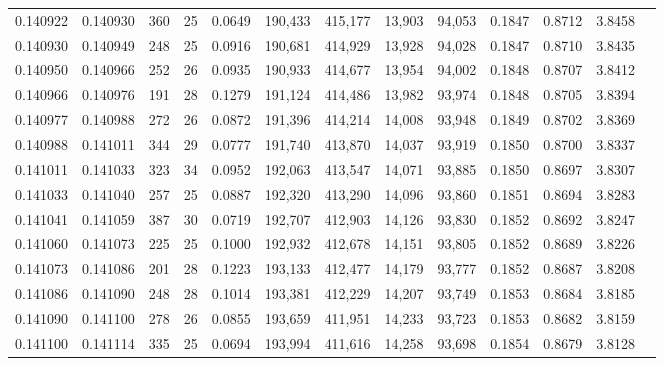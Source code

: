 \begin{tabular}{rrrrrrrrrrrrr}
0.140922 & 0.140930 & 360 &  25 &                                     0.0649 & 190,433 & 415,177 &  13,903 &  94,053 & 0.1847 & 0.8712 & 3.8458 \\
0.140930 & 0.140949 & 248 &  25 &                                     0.0916 & 190,681 & 414,929 &  13,928 &  94,028 & 0.1847 & 0.8710 & 3.8435 \\
0.140950 & 0.140966 & 252 &  26 &                                     0.0935 & 190,933 & 414,677 &  13,954 &  94,002 & 0.1848 & 0.8707 & 3.8412 \\
0.140966 & 0.140976 & 191 &  28 &                                     0.1279 & 191,124 & 414,486 &  13,982 &  93,974 & 0.1848 & 0.8705 & 3.8394 \\
0.140977 & 0.140988 & 272 &  26 &                                     0.0872 & 191,396 & 414,214 &  14,008 &  93,948 & 0.1849 & 0.8702 & 3.8369 \\
0.140988 & 0.141011 & 344 &  29 &                                     0.0777 & 191,740 & 413,870 &  14,037 &  93,919 & 0.1850 & 0.8700 & 3.8337 \\
0.141011 & 0.141033 & 323 &  34 &                                     0.0952 & 192,063 & 413,547 &  14,071 &  93,885 & 0.1850 & 0.8697 & 3.8307 \\
0.141033 & 0.141040 & 257 &  25 &                                     0.0887 & 192,320 & 413,290 &  14,096 &  93,860 & 0.1851 & 0.8694 & 3.8283 \\
0.141041 & 0.141059 & 387 &  30 &                                     0.0719 & 192,707 & 412,903 &  14,126 &  93,830 & 0.1852 & 0.8692 & 3.8247 \\
0.141060 & 0.141073 & 225 &  25 &                                     0.1000 & 192,932 & 412,678 &  14,151 &  93,805 & 0.1852 & 0.8689 & 3.8226 \\
0.141073 & 0.141086 & 201 &  28 &                                     0.1223 & 193,133 & 412,477 &  14,179 &  93,777 & 0.1852 & 0.8687 & 3.8208 \\
0.141086 & 0.141090 & 248 &  28 &                                     0.1014 & 193,381 & 412,229 &  14,207 &  93,749 & 0.1853 & 0.8684 & 3.8185 \\
0.141090 & 0.141100 & 278 &  26 &                                     0.0855 & 193,659 & 411,951 &  14,233 &  93,723 & 0.1853 & 0.8682 & 3.8159 \\
0.141100 & 0.141114 & 335 &  25 &                                     0.0694 & 193,994 & 411,616 &  14,258 &  93,698 & 0.1854 & 0.8679 & 3.8128 \\

\end{tabular}
